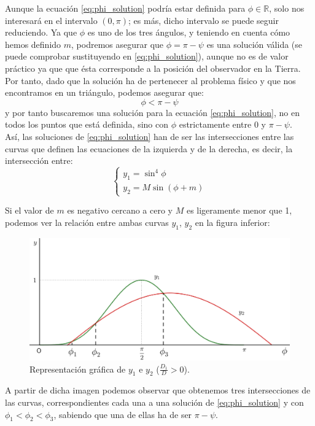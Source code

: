 \documentclass[11pt]{book}
\begin{document}
Aunque la ecuación \eqref{eq:phi_solution} podría estar definida para $\phi\in\mathbb{R}$, solo nos interesará en el intervalo $(0,\pi)$; es más, dicho intervalo se puede seguir reduciendo. Ya que $\phi$ es uno de los tres ángulos, y teniendo en cuenta cómo hemos definido $m$, podremos asegurar que $\phi=\pi-\psi$ es una solución válida (se puede comprobar sustituyendo en \eqref{eq:phi_solution}), aunque no es de valor práctico ya que que ésta corresponde a la posición del observador en la Tierra. Por tanto, dado que la solución ha de pertenecer al problema físico y que nos encontramos en un triángulo, podemos asegurar que:
\[
\phi<\pi-\psi
\]
\noindent y por tanto buscaremos una solución para la ecuación \eqref{eq:phi_solution}, no en todos los puntos que está definida, sino con $\phi$ estrictamente entre 0 y $\pi-\psi$.\\

Así, las soluciones de \eqref{eq:phi_solution} han de ser las intersecciones entre las curvas que definen las ecuaciones de la izquierda y de la derecha, es decir, la intersección entre:
\[
\left\{
\begin{array}{l}
	y_1=\sin^4{\phi}\\
	y_2=M\sin{(\phi+m)}
\end{array}
\right.
\]

Si el valor de $m$ es negativo cercano a cero y $M$ es ligeramente menor que 1, podemos ver la relación entre ambas curvas $y_1$, $y_2$ en la figura inferior:

\begin{figure}[H]
\centering
\includegraphics[scale=0.125]{images/phi_solution_m_negative_M_near_1.png}
\caption{Representación gráfica de $y_1$ e $y_2$ ($\frac{D_1}{D}>0$).}
\label{fig:phi_solution_m_negative_M_near_1}
\end{figure}

A partir de dicha imagen podemos observar que obtenemos tres intersecciones de las curvas, correspondientes cada una a una solución de \eqref{eq:phi_solution} y con $\phi_1<\phi_2<\phi_3$, sabiendo que una de ellas ha de ser $\pi-\psi$.\\
\end{document}

